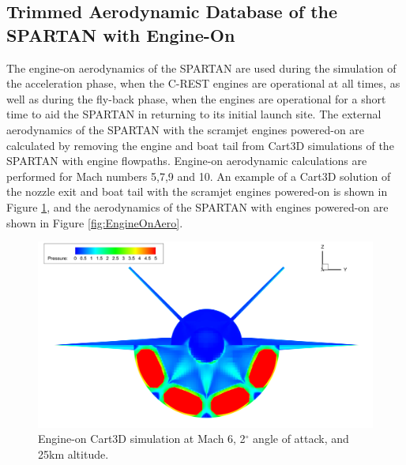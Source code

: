 		
		
		\subsection{Trimmed Aerodynamic Database of the SPARTAN with Engine-On}\label{sec:trimmedongineon}
		
		The engine-on aerodynamics of the SPARTAN are used during the simulation of the acceleration phase, when the C-REST engines are operational at all times, as well as during the fly-back phase, when the engines are operational for a short time to aid the SPARTAN in returning to its initial launch site.
		The external aerodynamics of the SPARTAN with the scramjet engines powered-on are calculated by removing the engine and boat tail from Cart3D simulations of the SPARTAN with engine flowpaths. Engine-on aerodynamic calculations are performed for Mach numbers 5,7,9 and 10. An example of a Cart3D solution of the nozzle exit and boat tail with the scramjet engines powered-on is shown in Figure \ref{fig:EngineOn}, and the aerodynamics of the SPARTAN with engines powered-on are shown in Figure \ref{fig:EngineOnAero}.
		
		
		\begin{figure}[ht]
			\centering
			\includegraphics[width=0.9\linewidth]{figures/3_vehicle_design/EngineOn}
			\caption{Engine-on Cart3D simulation at Mach 6, 2$^\circ$ angle of attack, and 25km altitude.}
			\label{fig:EngineOn}
		\end{figure}
		
